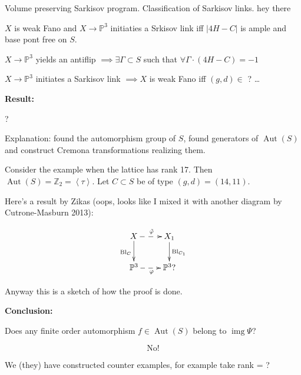 Volume preserving Sarkisov program.
Classification of Sarkisov links.
hey there

\begin{proposition}
\label{proposition-paiva-4}
$X$ is weak Fano and $X \to \mathbb{P}^3$
initiaties a Srkisov link iff $|4H-C|$ is
ample and base pont free on $S$.
\end{proposition}

\begin{proposition}
\label{proposition-paiva-5}
$X \to \mathbb{P}^3$ yields an antiflip
$\implies  \exists \Gamma \subset S$ such
that $\forall \Gamma\cdot (4H-C)=-1$
\end{proposition}

\begin{proposition}
\label{proposition-paiva-6}
$X \to \mathbb{P}^3$ initiates a Sarkisov
link $\implies X $ is weak Fano iff $(g,d)
\in$ ? \ldots{}
\end{proposition}

\textbf{Result:}
\begin{theorem}
\label{theorem-paiva-4}
?
\end{theorem}
Explanation: found the automorphism group of
$S$, found generators of
$\operatorname{Aut}(S)$ and construct Cremona
transformations realizing them.

Consider the example when the lattice has
rank 17. Then
$\operatorname{Aut}(S)=\mathbb{Z}_2=\left
\langle{}
\tau \right\rangle{}$. Let $C \subset S$ be
of type $(g,d)=(14,11)$.

Here's a result by Zikas (oops, looks like I
mixed it with another diagram by
Cutrone-Masburn 2013):

$$
\xymatrix{X\ar@{-->}[r]^{\tilde{\varphi}}
\ar[d]_{\operatorname{Bl}_C}&X_1\ar[d]^{
\operatorname{Bl}_{C_1}}\\
\mathbb{P}^3\ar@{-->}[r]_{\varphi}&{
\mathbb{P}^3?}}
$$

Anyway this is a sketch of how the proof is
done.

\textbf{Conclusion:}

\medskip{}
Does any finite order automorphism $f \in
\operatorname{Aut}(S)$ belong to
$\operatorname{img}\Psi$?

$$
\text{No!}
$$

We (they) have constructed counter examples,
for example take rank = ?

\medskip{}

